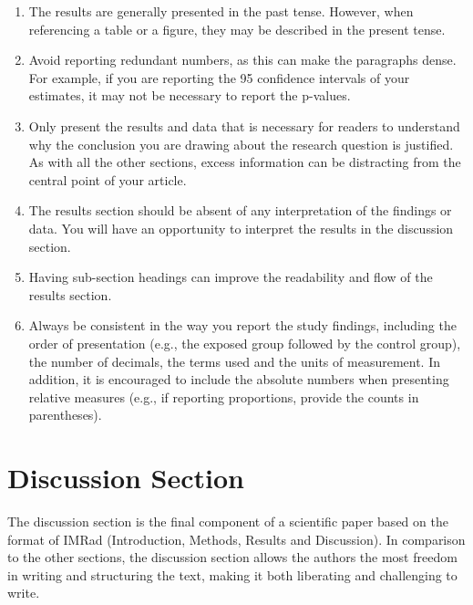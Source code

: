 \documentclass[
]{book}
\providecommand{\tightlist}{%
  \setlength{\itemsep}{0pt}\setlength{\parskip}{0pt}}
\begin{document}
\begin{enumerate}
\def\labelenumi{\arabic{enumi}.}
\tightlist
\item
  The results are generally presented in the past tense. However, when referencing a table or a figure, they may be described in the present tense.
\item
  Avoid reporting redundant numbers, as this can make the paragraphs dense. For example, if you are reporting the 95 confidence intervals of your estimates, it may not be necessary to report the p-values.
\item
  Only present the results and data that is necessary for readers to understand why the conclusion you are drawing about the research question is justified. As with all the other sections, excess information can be distracting from the central point of your article.
\item
  The results section should be absent of any interpretation of the findings or data. You will have an opportunity to interpret the results in the discussion section.
\item
  Having sub-section headings can improve the readability and flow of the results section.
\item
  Always be consistent in the way you report the study findings, including the order of presentation (e.g., the exposed group followed by the control group), the number of decimals, the terms used and the units of measurement. In addition, it is encouraged to include the absolute numbers when presenting relative measures (e.g., if reporting proportions, provide the counts in parentheses).
\end{enumerate}

\hypertarget{discussion-section}{%
\chapter{Discussion Section}\label{discussion-section}}

The discussion section is the final component of a scientific paper based on the format of IMRad (Introduction, Methods, Results and Discussion). In comparison to the other sections, the discussion section allows the authors the most freedom in writing and structuring the text, making it both liberating and challenging to write.
\end{document}
